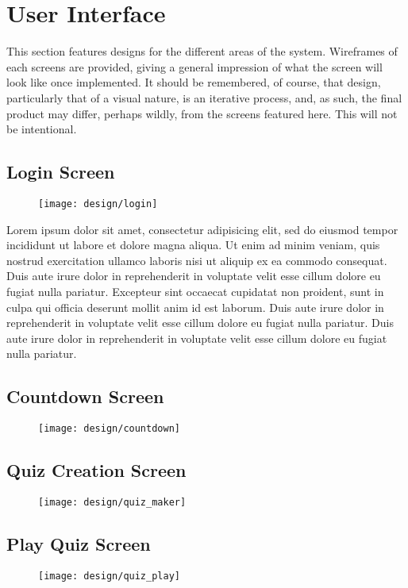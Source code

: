 \section{User Interface}
This section features designs for the different areas of the system. Wireframes of each screens are provided, giving a general impression of what the screen will look like once implemented. It should be remembered, of course, that design, particularly that of a visual nature, is an iterative process, and, as such, the final product may differ, perhaps wildly, from the screens featured here. This will not be intentional.

\subsection{Login Screen}
\begin{figure}[h!]
  \texttt{[image: design/login]}
\end{figure}

Lorem ipsum dolor sit amet, consectetur adipisicing elit, sed do eiusmod
tempor incididunt ut labore et dolore magna aliqua. Ut enim ad minim veniam,
quis nostrud exercitation ullamco laboris nisi ut aliquip ex ea commodo
consequat. Duis aute irure dolor in reprehenderit in voluptate velit esse
cillum dolore eu fugiat nulla pariatur. Excepteur sint occaecat cupidatat non
proident, sunt in culpa qui officia deserunt mollit anim id est laborum.
Duis aute irure dolor in reprehenderit in voluptate velit esse
cillum dolore eu fugiat nulla pariatur. Duis aute irure dolor in reprehenderit in voluptate velit esse
cillum dolore eu fugiat nulla pariatur.

\clearpage

\subsection{Countdown Screen}
\begin{figure}[h!]
  \texttt{[image: design/countdown]}
\end{figure}

\clearpage

\subsection{Quiz Creation Screen}
\begin{figure}[h!]
  \texttt{[image: design/quiz\_maker]}
\end{figure}

\clearpage

\subsection{Play Quiz Screen}
\begin{figure}[h!]
  \texttt{[image: design/quiz\_play]}
\end{figure}
